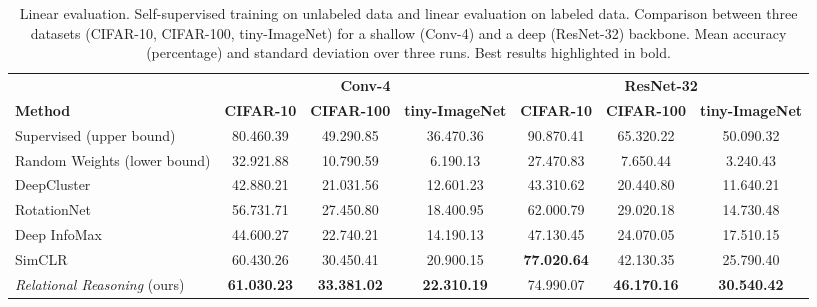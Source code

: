 \documentclass{article}
\begin{document}
\begin{table}[H]
 \caption{Linear evaluation. Self-supervised training on unlabeled data and linear evaluation on labeled data. Comparison between three datasets (CIFAR-10, CIFAR-100, tiny-ImageNet) for a shallow (Conv-4) and a deep (ResNet-32) backbone. Mean accuracy (percentage) and standard deviation over three runs. Best results highlighted in bold.}
 \label{tab:linear_evaluation}
 \begin{adjustbox}{width=\columnwidth,center}
  \centering
  \begin{tabular}{lcccccc}
    \toprule
     & \multicolumn{3}{c}{\textbf{Conv-4}} & \multicolumn{3}{c}{\textbf{ResNet-32}} \\
    \cmidrule[0.1pt](r){2-4} \cmidrule[0.1pt](l){5-7}
    \textbf{Method} &
    \textbf{CIFAR-10} & \textbf{CIFAR-100} & \textbf{tiny-ImageNet} &
    \textbf{CIFAR-10} & \textbf{CIFAR-100} & \textbf{tiny-ImageNet} \\
    \midrule
    Supervised (upper bound) & 
    80.46\small{0.39} & 49.29\small{0.85}  & 36.47\small{0.36} &
    90.87\small{0.41} & 65.32\small{0.22}  & 50.09\small{0.32} \\
    Random Weights (lower bound) & 
    32.92\small{1.88} & 10.79\small{0.59}  & 6.19\small{0.13} &
    27.47\small{0.83} &  7.65\small{0.44}  & 3.24\small{0.43} \\
    \cmidrule(l){1-7}
    DeepCluster \citep{caron2018deep} & 
    42.88\small{0.21} & 21.03\small{1.56}  & 12.60\small{1.23} &
    43.31\small{0.62} & 20.44\small{0.80}  & 11.64\small{0.21} \\
    RotationNet \citep{gidaris2018unsupervised} & 
    56.73\small{1.71} & 27.45\small{0.80}  & 18.40\small{0.95} &
    62.00\small{0.79} & 29.02\small{0.18}  & 14.73\small{0.48} \\
    Deep InfoMax \citep{hjelm2018learning} & 
    44.60\small{0.27} & 22.74\small{0.21}  & 14.19\small{0.13} &
    47.13\small{0.45} & 24.07\small{0.05}  & 17.51\small{0.15} \\
    SimCLR \citep{chen2020simple} & 
    60.43\small{0.26} & 30.45\small{0.41}  & 20.90\small{0.15} &
    \textbf{77.02\small{0.64}} & 42.13\small{0.35}  & 25.79\small{0.40} \\  
    \emph{Relational Reasoning} (ours)  & \textbf{61.03\small{0.23}} & \textbf{33.38\small{1.02}}  & \textbf{22.31\small{0.19}} &
    74.99\small{0.07} & \textbf{46.17\small{0.16}}  & \textbf{30.54\small{0.42}} \\
    \bottomrule
  \end{tabular}
 \end{adjustbox}
\end{table}
\end{document}
